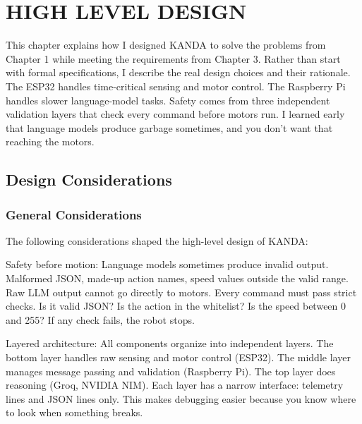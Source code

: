 \chapter{HIGH LEVEL DESIGN}
\label{ch:hld}

This chapter explains how I designed KANDA to solve the problems from Chapter 1 while meeting the requirements from Chapter 3. Rather than start with formal specifications, I describe the real design choices and their rationale. The ESP32 handles time-critical sensing and motor control. The Raspberry Pi handles slower language-model tasks. Safety comes from three independent validation layers that check every command before motors run. I learned early that language models produce garbage sometimes, and you don't want that reaching the motors.


\section{Design Considerations}
\label{sec:design}

\subsection{General Considerations}
\label{subsec:general}

The following considerations shaped the high-level design of KANDA:

Safety before motion: Language models sometimes produce invalid output. Malformed JSON, made-up action names, speed values outside the valid range. Raw LLM output cannot go directly to motors. Every command must pass strict checks. Is it valid JSON? Is the action in the whitelist? Is the speed between 0 and 255? If any check fails, the robot stops.

Layered architecture: All components organize into independent layers. The bottom layer handles raw sensing and motor control (ESP32). The middle layer manages message passing and validation (Raspberry Pi). The top layer does reasoning (Groq, NVIDIA NIM). Each layer has a narrow interface: telemetry lines and JSON lines only. This makes debugging easier because you know where to look when something breaks.

